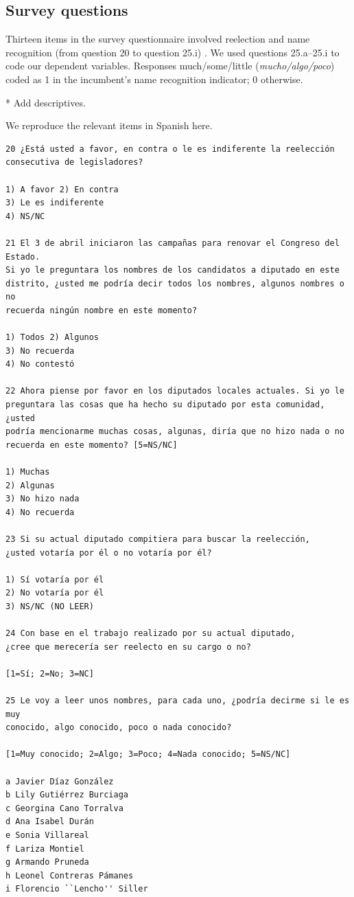 \documentclass[letter,12pt]{article}
\begin{document}
\subsection{Survey questions}
Thirteen items in the survey questionnaire involved reelection and name recognition (from question 20 to question 25.i) . We used questions 25.a--25.i to code our dependent variables. Responses much/some/little (\emph{mucho/algo/poco}) coded as 1 in the incumbent's name recognition indicator; 0 otherwise.

* Add descriptives. 

We reproduce the relevant items in Spanish here.

\begin{footnotesize}
\begin{verbatim}
20 ¿Está usted a favor, en contra o le es indiferente la reelección 
consecutiva de legisladores?

1) A favor 2) En contra
3) Le es indiferente
4) NS/NC

21 El 3 de abril iniciaron las campañas para renovar el Congreso del Estado. 
Si yo le preguntara los nombres de los candidatos a diputado en este 
distrito, ¿usted me podría decir todos los nombres, algunos nombres o no 
recuerda ningún nombre en este momento?

1) Todos 2) Algunos
3) No recuerda
4) No contestó

22 Ahora piense por favor en los diputados locales actuales. Si yo le 
preguntara las cosas que ha hecho su diputado por esta comunidad, ¿usted 
podría mencionarme muchas cosas, algunas, diría que no hizo nada o no 
recuerda en este momento? [5=NS/NC]

1) Muchas
2) Algunas
3) No hizo nada
4) No recuerda

23 Si su actual diputado compitiera para buscar la reelección,
¿usted votaría por él o no votaría por él?

1) Sí votaría por él
2) No votaría por él
3) NS/NC (NO LEER)

24 Con base en el trabajo realizado por su actual diputado,
¿cree que merecería ser reelecto en su cargo o no?

[1=Sí; 2=No; 3=NC]

25 Le voy a leer unos nombres, para cada uno, ¿podría decirme si le es muy 
conocido, algo conocido, poco o nada conocido?

[1=Muy conocido; 2=Algo; 3=Poco; 4=Nada conocido; 5=NS/NC]

a Javier Díaz González     
b Lily Gutiérrez Burciaga  
c Georgina Cano Torralva   
d Ana Isabel Durán         
e Sonia Villareal          
f Lariza Montiel           
g Armando Pruneda          
h Leonel Contreras Pámanes 
i Florencio ``Lencho'' Siller
\end{verbatim}
\end{footnotesize}
\end{document}
